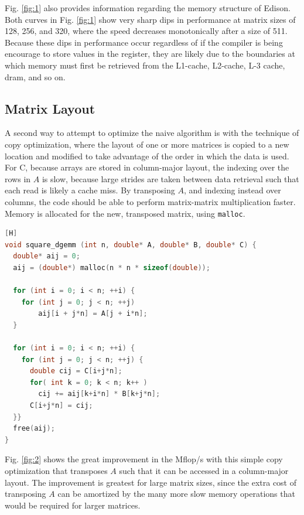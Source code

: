 \documentclass[10pt]{article}
\begin{document}
Fig. \ref{fig:1} also provides information regarding the memory structure of Edison. Both curves in Fig. \ref{fig:1} show very sharp dips in performance at matrix sizes of 128, 256, and 320, where the speed decreases monotonically after a size of 511. Because these dips in performance occur regardless of if the compiler is being encourage to store values in the register, they are likely due to the boundaries at which memory must first be retrieved from the L1-cache, L2-cache, L-3 cache, \gls{dram}, and so on.

\subsection{Matrix Layout}
A second way to attempt to optimize the naive algorithm is with the technique of copy optimization, where the layout of one or more matrices is copied to a new location and modified to take advantage of the order in which the data is used. For C, because arrays are stored in column-major layout, the indexing over the rows in \(A\) is slow, because large strides are taken between data retrieval such that each read is likely a cache miss. By transposing \(A\), and indexing instead over columns, the code should be able to perform matrix-matrix multiplication faster. Memory is allocated for the new, transposed matrix, using {\tt malloc}.

\begin{lstlisting}[language=C, basicstyle=\small][H]
void square_dgemm (int n, double* A, double* B, double* C) {
  double* aij = 0;
  aij = (double*) malloc(n * n * sizeof(double));

  for (int i = 0; i < n; ++i) {
    for (int j = 0; j < n; ++j)
        aij[i + j*n] = A[j + i*n];
  }

  for (int i = 0; i < n; ++i) {
    for (int j = 0; j < n; ++j) {
      double cij = C[i+j*n];
      for( int k = 0; k < n; k++ )
        cij += aij[k+i*n] * B[k+j*n];
      C[i+j*n] = cij;
  }}
  free(aij);
}
\end{lstlisting}

Fig. \ref{fig:2} shows the great improvement in the Mflop/s with this simple copy optimization that transposes \(A\) such that it can be accessed in a column-major layout. The improvement is greatest for large matrix sizes, since the extra cost of transposing \(A\) can be amortized by the many more slow memory operations that would be required for larger matrices.
\end{document}
